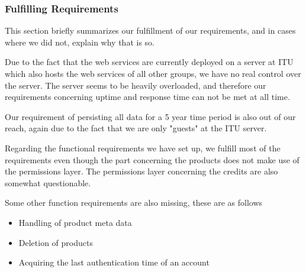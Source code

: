 \subsubsection{Fulfilling Requirements}
\label{serverfulfil}
This section briefly summarizes our fulfillment of our requirements, and in cases where we did not, explain why that is so.

Due to the fact that the web services are currently deployed on a server at ITU which also hosts the web services of all other groups, we have no real control over the server. The server seems to be heavily overloaded, and therefore our requirements concerning uptime and response time can not be met at all time.

Our requirement of persisting all data for a 5 year time period is also out of our reach, again due to the fact that we are only "guests" at the ITU server.

Regarding the functional requirements we have set up, we fulfill most of the requirements even though the part concerning the products does not make use of the permissions layer. The permissions layer concerning the credits are also somewhat questionable. 

Some other function requirements are also missing, these are as follows
\begin{itemize}
\item Handling of product meta data
\item Deletion of products
\item Acquiring the last authentication time of an account
\end{itemize}


